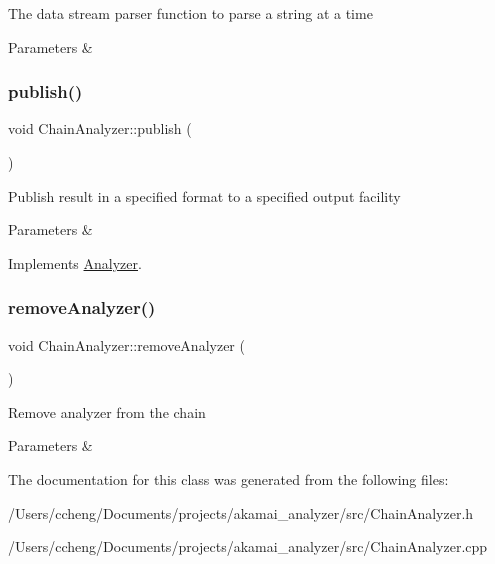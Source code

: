 The data stream parser function to parse a string at a time


\begin{DoxyParams}{Parameters}
{\em } & \\
\hline
\end{DoxyParams}
\mbox{\label{class_chain_analyzer_a37568296a227c8f859917e765ab05dc2}} 
\subsubsection{\texorpdfstring{publish()}{publish()}}
{\footnotesize\ttfamily void Chain\+Analyzer\+::publish (\begin{DoxyParamCaption}{ }\end{DoxyParamCaption})\hspace{0.3cm}{\ttfamily [virtual]}}

Publish result in a specified format to a specified output facility


\begin{DoxyParams}{Parameters}
{\em } & \\
\hline
\end{DoxyParams}


Implements \mbox{\hyperlink{class_analyzer}{Analyzer}}.

\mbox{\label{class_chain_analyzer_a836517181436aa5402ddd01374a496dd}} 
\subsubsection{\texorpdfstring{remove\+Analyzer()}{removeAnalyzer()}}
{\footnotesize\ttfamily void Chain\+Analyzer\+::remove\+Analyzer (\begin{DoxyParamCaption}{ }\end{DoxyParamCaption})}

Remove analyzer from the chain


\begin{DoxyParams}{Parameters}
{\em } & \\
\hline
\end{DoxyParams}


The documentation for this class was generated from the following files\+:\begin{DoxyCompactItemize}
\item 
/\+Users/ccheng/\+Documents/projects/akamai\+\_\+analyzer/src/Chain\+Analyzer.\+h\item 
/\+Users/ccheng/\+Documents/projects/akamai\+\_\+analyzer/src/Chain\+Analyzer.\+cpp\end{DoxyCompactItemize}

